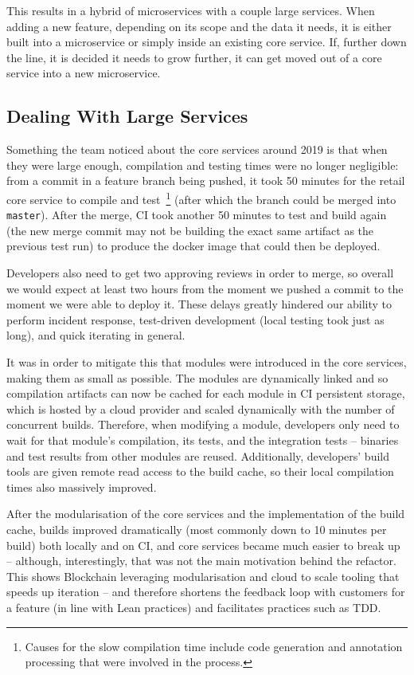 \documentclass[conference]{IEEEtran}
\begin{document}
    This results in a hybrid of microservices with a couple large services.
    When adding a new feature, depending on its scope and the data it needs, it is either built into
    a microservice or simply inside an existing core service.
    If, further down the line, it is decided it needs to grow further, it can get moved out of a
    core service into a new microservice.

    \subsection{Dealing With Large Services}

    Something the team noticed about the core services around 2019 is that when they were large
    enough, compilation and testing times were no longer negligible: from a commit in a feature
    branch being pushed, it took 50 minutes for the retail core service to compile and test~\footnote{
        Causes for the slow compilation time include code generation and annotation processing that were involved in the process.
    }
    (after which the branch could be merged into \texttt{master}).
    After the merge, CI took another 50 minutes to test and build again (the new merge commit
    may not be building the exact same artifact as the previous test run) to produce
    the docker image that could then be deployed.

    Developers also need to get two approving reviews in order to merge, so overall we would expect at least two hours from the moment we pushed a commit to the moment we were able to deploy it.
    These delays greatly hindered our ability to perform incident response, test-driven development (local testing took just as long), and quick iterating in general.

    It was in order to mitigate this that modules were introduced in the core services, making them as small as possible.
    The modules are dynamically linked and so compilation artifacts can now be cached for each module in CI persistent storage, which is hosted by a cloud provider and scaled dynamically with the number of concurrent builds.
    Therefore, when modifying a module, developers only need to wait for that module's compilation, its tests, and the integration tests -- binaries and test results from other modules are reused.
    Additionally, developers' build tools are given remote read access to the build cache, so their local compilation times also massively improved.

    After the modularisation of the core services and the implementation of the build cache, builds improved dramatically (most commonly down to 10 minutes per build) both locally and on CI, and core services became much easier to break up -- although, interestingly, that was not the main motivation behind the refactor.
    This shows Blockchain leveraging modularisation and cloud to scale tooling that speeds up iteration -- and therefore shortens the feedback loop with customers for a feature (in line with Lean practices) and facilitates practices such as TDD\@.
\end{document}
